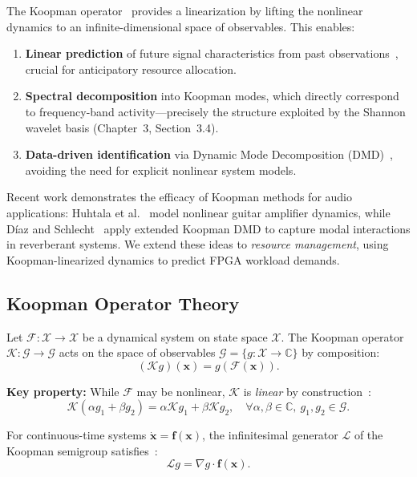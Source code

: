 The Koopman operator~\cite{Mezic2005} provides a linearization by lifting the nonlinear dynamics to an infinite-dimensional space of observables. This enables:
\begin{enumerate}
\item \textbf{Linear prediction} of future signal characteristics from past observations~\cite{Williams2015,Proctor2016}, crucial for anticipatory resource allocation.
\item \textbf{Spectral decomposition} into Koopman modes, which directly correspond to frequency-band activity—precisely the structure exploited by the Shannon wavelet basis (Chapter~3, Section~3.4).
\item \textbf{Data-driven identification} via Dynamic Mode Decomposition (DMD)~\cite{Schmid2010}, avoiding the need for explicit nonlinear system models.
\end{enumerate}

Recent work demonstrates the efficacy of Koopman methods for audio applications: Huhtala et al.~\cite{Huhtala2024} model nonlinear guitar amplifier dynamics, while Díaz and Schlecht~\cite{DiazSchlecht2024} apply extended Koopman DMD to capture modal interactions in reverberant systems. We extend these ideas to \emph{resource management}, using Koopman-linearized dynamics to predict FPGA workload demands.

\subsection{Koopman Operator Theory}

Let $\mathcal{F}: \mathcal{X} \to \mathcal{X}$ be a dynamical system on state space $\mathcal{X}$. The Koopman operator $\mathcal{K}: \mathcal{G} \to \mathcal{G}$ acts on the space of observables $\mathcal{G} = \{g: \mathcal{X} \to \mathbb{C}\}$ by composition:
\[
(\mathcal{K} g)(\mathbf{x}) = g(\mathcal{F}(\mathbf{x})).
\]

\noindent\textbf{Key property:} While $\mathcal{F}$ may be nonlinear, $\mathcal{K}$ is \emph{linear} by construction~\cite{Koopman1931}:
\[
\mathcal{K}(\alpha g_1 + \beta g_2) = \alpha \mathcal{K} g_1 + \beta \mathcal{K} g_2, \quad \forall \alpha, \beta \in \mathbb{C}, \ g_1, g_2 \in \mathcal{G}.
\]

For continuous-time systems $\dot{\mathbf{x}} = \mathbf{f}(\mathbf{x})$, the infinitesimal generator $\mathcal{L}$ of the Koopman semigroup satisfies~\cite{Mezic2005}:
\[
\mathcal{L} g = \nabla g \cdot \mathbf{f}(\mathbf{x}).
\]

